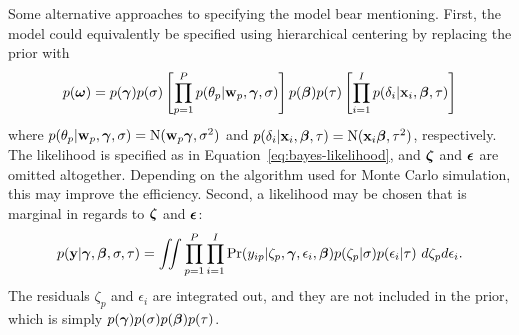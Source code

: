 \documentclass[12pt, letterpaper]{article}
\begin{document}
Some alternative approaches to specifying the model bear mentioning. First, the model could equivalently be specified using hierarchical centering \cite{gelfand1995efficient} by replacing the prior with
\begin{equation}
	p(\boldsymbol{\omega}) =
	p(\boldsymbol{\gamma}) p(\sigma)
	\left [ 
		\prod_{p=1}^P p(\theta_p | \mathbf{w}_p, \boldsymbol{\gamma}, \sigma)
	\right ]
	p(\boldsymbol{\beta}) 	p(\tau)
	\left [ 
		\prod_{i=1}^I p(\delta_i | \mathbf{x}_i, \boldsymbol{\beta}, \tau) 
	\right ]
\end{equation}
where 
$p(\theta_p | \mathbf{w}_p, \boldsymbol{\gamma}, \sigma) = \mathrm{N}(\mathbf{w}_p \boldsymbol{\gamma}, \sigma^2)$ and
$p(\delta_i | \mathbf{x}_i, \boldsymbol{\beta}, \tau)    = \mathrm{N}(\mathbf{x}_i \boldsymbol{\beta}, \tau^2)$, 
respectively. The likelihood is specified as in Equation~\ref{eq:bayes-likelihood}, and $\boldsymbol{\zeta}$ and $\boldsymbol{\epsilon}$ are omitted altogether. Depending on the algorithm used for Monte Carlo simulation, this may improve the efficiency.
Second, a likelihood may be chosen that is marginal in regards to $\boldsymbol{\zeta}$ and $\boldsymbol{\epsilon}$:
\begin{equation} \label{eq:marginal-likelihood}
	p(\mathbf{y} | \boldsymbol{\gamma}, \boldsymbol{\beta}, \sigma, \tau) =
	\iint
		\prod_{p=1}^P \prod_{i=1}^I 
		\Pr({y_{ip}} | \zeta_p, \boldsymbol{\gamma}, \epsilon_i, \boldsymbol{\beta})
		p(\zeta_p | \sigma)
		p(\epsilon_i | \tau)
	~d \zeta_p d \epsilon_i
.\end{equation}
The residuals $\zeta_p$ and $\epsilon_i$ are integrated out, and they are not included in the prior, which is simply $p(\boldsymbol{\gamma}) p(\sigma) p(\boldsymbol{\beta}) p(\tau)$.

\end{document}
